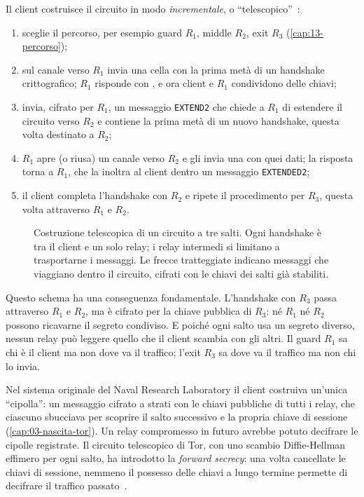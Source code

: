 Il client costruisce il circuito in modo \emph{incrementale}, o \enquote{telescopico}~\cite{dingledine2004tor}:
\begin{enumerate}
  \item sceglie il percorso, per esempio guard $R_1$, middle $R_2$, exit $R_3$ (\cref{cap:13-percorso});
  \item sul canale verso $R_1$ invia una cella  con la prima metà di un handshake crittografico; $R_1$ risponde con , e ora client e $R_1$ condividono delle chiavi;
  \item invia, cifrato per $R_1$, un messaggio \texttt{EXTEND2} che chiede a $R_1$ di estendere il circuito verso $R_2$ e contiene la prima metà di un nuovo handshake, questa volta destinato a $R_2$;
  \item $R_1$ apre (o riusa) un canale verso $R_2$ e gli invia una  con quei dati; la risposta  torna a $R_1$, che la inoltra al client dentro un messaggio \texttt{EXTENDED2};
  \item il client completa l'handshake con $R_2$ e ripete il procedimento per $R_3$, questa volta attraverso $R_1$ e $R_2$.
\end{enumerate}

\begin{figure}[htbp]
\centering

\caption{Costruzione telescopica di un circuito a tre salti. Ogni handshake è tra il client e un solo relay; i relay intermedi si limitano a trasportarne i messaggi. Le frecce tratteggiate indicano messaggi che viaggiano dentro il circuito, cifrati con le chiavi dei salti già stabiliti.}
\label{fig:telescopio}
\end{figure}

Questo schema ha una conseguenza fondamentale. L'handshake con $R_3$ passa attraverso $R_1$ e $R_2$, ma è cifrato per la chiave pubblica di $R_3$: né $R_1$ né $R_2$ possono ricavarne il segreto condiviso. E poiché ogni salto usa un segreto diverso, nessun relay può leggere quello che il client scambia con gli altri. Il guard $R_1$ sa chi è il client ma non dove va il traffico; l'exit $R_3$ sa dove va il traffico ma non chi lo invia.

\begin{storia}
Nel sistema originale del Naval Research Laboratory il client costruiva un'unica \enquote{cipolla}: un messaggio cifrato a strati con le chiavi pubbliche di tutti i relay, che ciascuno sbucciava per scoprire il salto successivo e la propria chiave di sessione (\cref{cap:03-nascita-tor}). Un relay compromesso in futuro avrebbe potuto decifrare le cipolle registrate. Il circuito telescopico di Tor, con uno scambio Diffie-Hellman effimero per ogni salto, ha introdotto la \emph{forward secrecy}: una volta cancellate le chiavi di sessione, nemmeno il possesso delle chiavi a lungo termine permette di decifrare il traffico passato~\cite{dingledine2004tor}.
\end{storia}

